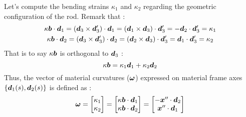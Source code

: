Let's compute the bending strains $\kappa_1$ and $\kappa_2$ regarding the geometric configuration of the rod. Remark that :
\begin{subequations}
	\begin{gather}
	\kappa\boldsymbol{b}\cdot\boldsymbol{d}_1 = (\boldsymbol{d}_3\times\boldsymbol{d}'_3)\cdot\boldsymbol{d}_1 = (\boldsymbol{d}_1\times\boldsymbol{d}_3)\cdot\boldsymbol{d}'_3 = -\boldsymbol{d}_2\cdot\boldsymbol{d}'_3 = \kappa_1 \\
	\kappa\boldsymbol{b}\cdot\boldsymbol{d}_2 = (\boldsymbol{d}_3\times\boldsymbol{d}'_3)\cdot\boldsymbol{d}_2 = (\boldsymbol{d}_2\times\boldsymbol{d}_3)\cdot\boldsymbol{d}'_3 = \boldsymbol{d}_1\cdot\boldsymbol{d}'_3 = \kappa_2
	\end{gather}
\end{subequations}
That is to say $\kappa\boldsymbol{b}$ is orthogonal to $\boldsymbol{d}_3$ :
\begin{equation}
	\kappa\boldsymbol{b} = \kappa_1\boldsymbol{d}_1 +   \kappa_2\boldsymbol{d}_2
\end{equation}
Thus, the vector of material curvatures ($\boldsymbol{\omega}$) expressed on material frame axes $\{\boldsymbol{d}_1(s),\boldsymbol{d}_2(s)\}$ is defined as :
\begin{equation}
	\boldsymbol{\omega} =
	\begin{bmatrix}
		\kappa_1\\
		\kappa_2\\
	\end{bmatrix} =
	\begin{bmatrix}
		\kappa\boldsymbol{b}\cdot\boldsymbol{d}_1\\
		\kappa\boldsymbol{b}\cdot\boldsymbol{d}_2\\
	\end{bmatrix} =
		\begin{bmatrix}
		-\boldsymbol{x}''\cdot\boldsymbol{d}_2\\
		\boldsymbol{x}''\cdot\boldsymbol{d}_1\\
	\end{bmatrix}
\end{equation}

